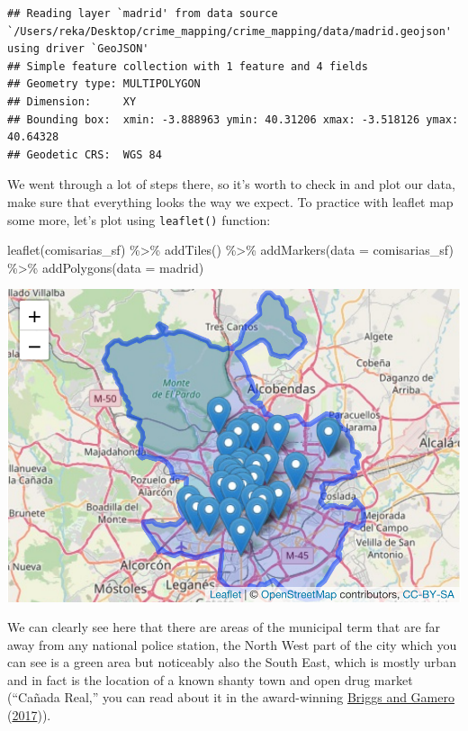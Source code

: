 \documentclass[
]{book}
\newenvironment{Shaded}{\begin{snugshade}}{\end{snugshade}}
\newcommand{\AttributeTok}[1]{\textcolor[rgb]{0.77,0.63,0.00}{#1}}
\newcommand{\FunctionTok}[1]{\textcolor[rgb]{0.00,0.00,0.00}{#1}}
\newcommand{\NormalTok}[1]{#1}
\newcommand{\SpecialCharTok}[1]{\textcolor[rgb]{0.00,0.00,0.00}{#1}}
\begin{document}
\begin{verbatim}
## Reading layer `madrid' from data source `/Users/reka/Desktop/crime_mapping/crime_mapping/data/madrid.geojson' using driver `GeoJSON'
## Simple feature collection with 1 feature and 4 fields
## Geometry type: MULTIPOLYGON
## Dimension:     XY
## Bounding box:  xmin: -3.888963 ymin: 40.31206 xmax: -3.518126 ymax: 40.64328
## Geodetic CRS:  WGS 84
\end{verbatim}

We went through a lot of steps there, so it's worth to check in and plot our data, make sure that everything looks the way we expect. To practice with leaflet map some more, let's plot using \texttt{leaflet()} function:

\begin{Shaded}
\begin{Highlighting}[]
\FunctionTok{leaflet}\NormalTok{(comisarias\_sf) }\SpecialCharTok{\%\textgreater{}\%} 
  \FunctionTok{addTiles}\NormalTok{() }\SpecialCharTok{\%\textgreater{}\%}
  \FunctionTok{addMarkers}\NormalTok{(}\AttributeTok{data =}\NormalTok{ comisarias\_sf) }\SpecialCharTok{\%\textgreater{}\%}
  \FunctionTok{addPolygons}\NormalTok{(}\AttributeTok{data =}\NormalTok{ madrid)}
\end{Highlighting}
\end{Shaded}

\includegraphics{crime_mapping_files/figure-latex/unnamed-chunk-60-1.pdf}

We can clearly see here that there are areas of the municipal term that are far away from any national police station, the North West part of the city which you can see is a green area but noticeably also the South East, which is mostly urban and in fact is the location of a known shanty town and open drug market (``Cañada Real,'' you can read about it in the award-winning \protect\hyperlink{ref-Briggs_2017}{Briggs and Gamero} (\protect\hyperlink{ref-Briggs_2017}{2017})).
\end{document}
